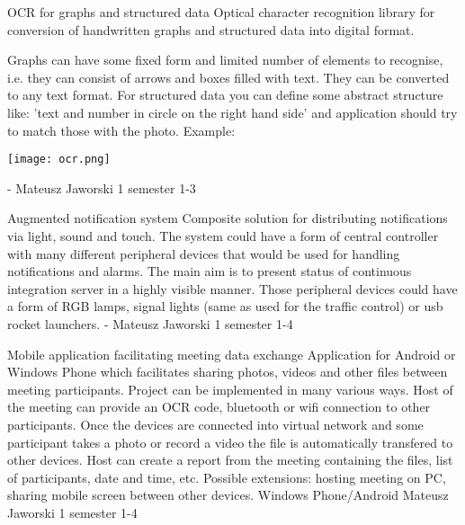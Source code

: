 \begin{project}
{OCR for graphs and structured data}
{Optical character recognition library for conversion of handwritten graphs and structured data into digital format.} 
{ 
Graphs can have some fixed form and limited number of elements to recognise, i.e. 
they can consist of arrows and boxes filled with text. They can be converted to any text format.
For structured data you can define some abstract structure like: 'text and
number in circle on the right hand side' and application should try to match
those with the photo. Example:
\begin{center}\texttt{[image: ocr.png]}\end{center}
}
{-}
{Mateusz Jaworski}
{1 semester}
{1-3}
\end{project}
\begin{project}
{Augmented notification system}
{Composite solution for distributing notifications via light, sound and touch.}
{
The system could have a form of central controller with many different 
peripheral devices that would be used for handling notifications and alarms. 
The main aim is to present status of continuous integration server in a highly visible manner. 
Those peripheral devices could have a form of RGB lamps, signal lights (same as used for the traffic control) or usb rocket launchers.
}
{-}
{Mateusz Jaworski}
{1 semester}
{1-4}
\end{project}
\begin{project}
{Mobile application facilitating meeting data exchange}
{Application for Android or Windows Phone which facilitates sharing photos,
videos and other files between meeting participants.} 
{
Project can be implemented in many various ways. Host of the meeting can
provide an OCR code, bluetooth or wifi connection to other participants. Once
the devices are connected into virtual network and some participant takes a
photo or record a video the file is automatically transfered to other devices.
Host can create a report from the meeting containing the files, list of
participants, date and time, etc. Possible extensions: hosting meeting on PC,
sharing mobile screen between other devices.}
{Windows Phone/Android}
{Mateusz Jaworski}
{1 semester}
{1-4}
\end{project}
